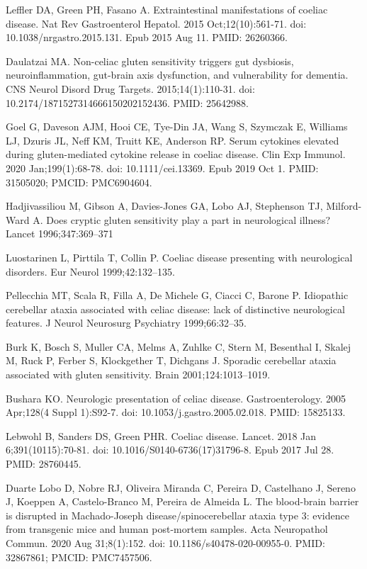 \documentclass{article}
\begin{document}
\begin{thebibliography}{9}
Leffler DA, Green PH, Fasano A. Extraintestinal manifestations of coeliac disease. Nat Rev Gastroenterol Hepatol. 2015 Oct;12(10):561-71. doi: 10.1038/nrgastro.2015.131. Epub 2015 Aug 11. PMID: 26260366.

Daulatzai MA. Non-celiac gluten sensitivity triggers gut dysbiosis, neuroinflammation, gut-brain axis dysfunction, and vulnerability for dementia. CNS Neurol Disord Drug Targets. 2015;14(1):110-31. doi: 10.2174/1871527314666150202152436. PMID: 25642988.

Goel G, Daveson AJM, Hooi CE, Tye-Din JA, Wang S, Szymczak E, Williams LJ, Dzuris JL, Neff KM, Truitt KE, Anderson RP. Serum cytokines elevated during gluten-mediated cytokine release in coeliac disease. Clin Exp Immunol. 2020 Jan;199(1):68-78. doi: 10.1111/cei.13369. Epub 2019 Oct 1. PMID: 31505020; PMCID: PMC6904604.

Hadjivassiliou M, Gibson A, Davies-Jones GA, Lobo AJ, Stephenson TJ, Milford-Ward A. Does cryptic gluten sensitivity play a part in neurological illness? Lancet 1996;347:369–371

Luostarinen L, Pirttila T, Collin P. Coeliac disease presenting with neurological disorders. Eur Neurol 1999;42:132–135.

Pellecchia MT, Scala R, Filla A, De Michele G, Ciacci C, Barone P. Idiopathic cerebellar ataxia associated with celiac disease: lack of distinctive neurological features. J Neurol Neurosurg Psychiatry 1999;66:32–35.

Burk K, Bosch S, Muller CA, Melms A, Zuhlke C, Stern M, Besenthal I, Skalej M, Ruck P, Ferber S, Klockgether T, Dichgans J. Sporadic cerebellar ataxia associated with gluten sensitivity. Brain 2001;124:1013–1019.

Bushara KO. Neurologic presentation of celiac disease. Gastroenterology. 2005 Apr;128(4 Suppl 1):S92-7. doi: 10.1053/j.gastro.2005.02.018. PMID: 15825133.

Lebwohl B, Sanders DS, Green PHR. Coeliac disease. Lancet. 2018 Jan 6;391(10115):70-81. doi: 10.1016/S0140-6736(17)31796-8. Epub 2017 Jul 28. PMID: 28760445.

Duarte Lobo D, Nobre RJ, Oliveira Miranda C, Pereira D, Castelhano J, Sereno J, Koeppen A, Castelo-Branco M, Pereira de Almeida L. The blood-brain barrier is disrupted in Machado-Joseph disease/spinocerebellar ataxia type 3: evidence from transgenic mice and human post-mortem samples. Acta Neuropathol Commun. 2020 Aug 31;8(1):152. doi: 10.1186/s40478-020-00955-0. PMID: 32867861; PMCID: PMC7457506.


\end{thebibliography}
\end{document}
